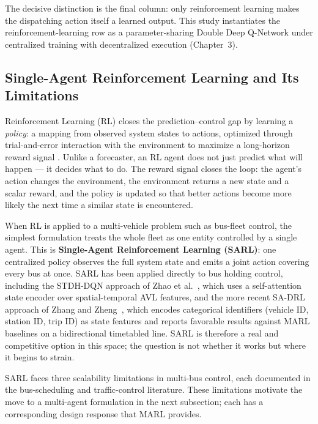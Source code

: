 The decisive distinction is the final column: only reinforcement learning makes the dispatching action itself a learned output. This study instantiates the reinforcement-learning row as a parameter-sharing Double Deep Q-Network under centralized training with decentralized execution (Chapter~3).
\FloatBarrier
\subsection{Single-Agent Reinforcement Learning and Its Limitations}
Reinforcement Learning (RL) closes the prediction--control gap by learning a \textit{policy}: a mapping from observed system states to actions, optimized through trial-and-error interaction with the environment to maximize a long-horizon reward signal \cite{Momenikorbekandi2023Intelligent}. Unlike a forecaster, an RL agent does not just predict what will happen --- it decides what to do. The reward signal closes the loop: the agent's action changes the environment, the environment returns a new state and a scalar reward, and the policy is updated so that better actions become more likely the next time a similar state is encountered.

When RL is applied to a multi-vehicle problem such as bus-fleet control, the simplest formulation treats the whole fleet as one entity controlled by a single agent. This is \textbf{Single-Agent Reinforcement Learning (SARL)}: one centralized policy observes the full system state and emits a joint action covering every bus at once. SARL has been applied directly to bus holding control, including the STDH-DQN approach of Zhao et al.~\cite{Zhao2022STDH}, which uses a self-attention state encoder over spatial-temporal AVL features, and the more recent SA-DRL approach of Zhang and Zheng~\cite{Zhang2025SADRL}, which encodes categorical identifiers (vehicle ID, station ID, trip ID) as state features and reports favorable results against MARL baselines on a bidirectional timetabled line. SARL is therefore a real and competitive option in this space; the question is not whether it works but where it begins to strain.

SARL faces three scalability limitations in multi-bus control, each documented in the bus-scheduling and traffic-control literature. These limitations motivate the move to a multi-agent formulation in the next subsection; each has a corresponding design response that MARL provides.

